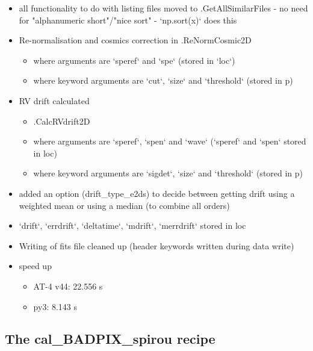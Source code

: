 \begin{itemize}
\item all functionality to do with listing files moved to \spirouImage{\hskip 0pt}.GetAllSimilarFiles - no need for "alphanumeric short"/"nice sort" - `np.sort(x)` does this
    
\item Re-normalisation and cosmics correction in \spirouRV.ReNormCosmic2D
	\begin{itemize}
	\item where arguments are `speref` and `spe` (stored in `loc`)
	\item where keyword arguments are `cut`, `size` and `threshold` (stored in p)
	\end{itemize}

\item RV drift calculated
	\begin{itemize}
	\item \spirouRV.CalcRVdrift2D
	\item where arguments are `speref`, `spen` and `wave` (`speref` and `spen` stored in loc)
	\item where keyword arguments are `sigdet`, `size` and `threshold` (stored in p)
	\end{itemize}

\item added an option (drift\_type\_e2ds) to decide between getting drift using a weighted mean or using a median (to combine all orders)

\item `drift`, `errdrift`, `deltatime`, `mdrift`, `merrdrift` stored in loc

\item Writing of fits file cleaned up (header keywords written during data write)

\item speed up
	\begin{itemize}
	\item AT-4 v44: 22.556 s
	\item py3:  8.143 s
	\end{itemize}

\end{itemize}


\subsection{The cal\_BADPIX\_spirou recipe}
\label{ch:changelog:At4:cal_BADPIX_spirou}

